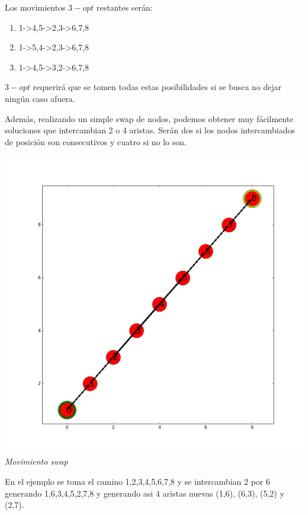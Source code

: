 Los movimientos $3-opt$ restantes serán:

\begin{enumerate}
\item 1->4,5->2,3->6,7,8
\item 1->5,4->2,3->6,7,8
\item 1->4,5->3,2->6,7,8
\end{enumerate}

$3-opt$ requerirá que se tomen todas estas posibilidades si se busca no dejar ningún caso afuera.

Además, realizando un simple swap de nodos, podemos obtener muy fácilmente soluciones que intercambian 2 o 4 aristas. Serán dos si los nodos intercambiados de posición son consecutivos y cuatro si no lo son.

\vspace*{0.3cm} \vspace*{0.3cm}
  \begin{center}
 \includegraphics[scale=0.3]{./EJ3/ejemploSwap.png}\\
 {            \textit{Movimiento swap}}
  \end{center}
  \vspace*{0.3cm}

En el ejemplo se toma el camino 1,2,3,4,5,6,7,8 y se intercambian 2 por 6 generando 1,6,3,4,5,2,7,8 y generando asi 4 aristas nuevas (1,6), (6,3), (5,2) y (2,7).

